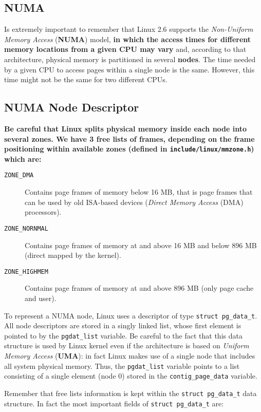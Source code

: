 \documentclass[10pt,a4paper]{article}
\begin{document}
\subsection{NUMA}

Is extremely important to remember that Linux 2.6 supports the \textit{Non-Uniform Memory Access} (\textbf{NUMA}) model, \textbf{in which the access times for different memory locations from a given CPU may vary} and, according to that architecture, physical memory is partitioned in several \textbf{nodes}. The time needed by a given CPU to access pages within a single node is the same. However, this time might not be the same for two different CPUs. 

\subsection{NUMA Node Descriptor}

\textbf{Be careful that Linux splits physical memory inside each node into several zones. We have 3 free lists of frames, depending on the frame positioning within available zones (defined in \texttt{include/linux/mmzone.h}) which are:}

\begin{description}
\item[\texttt{ZONE\_DMA}] Contains page frames of memory below 16 MB, that is page frames that can be used by old ISA-based devices (\textit{Direct Memory Access} (DMA) processors).
\item[\texttt{ZONE\_NORNMAL}] Contains page frames of memory at and above 16 MB and below 896 MB (direct mapped by the kernel).
\item[\texttt{ZONE\_HIGHMEM}] Contains page frames of memory at and above 896 MB (only page cache and user).
\end{description}

To represent a NUMA node, Linux uses a descriptor of type \texttt{struct pg\_data\_t}. All node descriptors are stored in a singly linked list, whose first
element is pointed to by the \texttt{pgdat\_list} variable. Be careful to the fact that this data structure is used by Linux kernel even if the architecture is based on \textit{Uniform Memory Access} (\textbf{UMA}): in fact Linux makes use of a single node that includes all system physical memory. Thus, the \texttt{pgdat\_list} variable points to a list consisting of a single element (node 0) stored in the \texttt{contig\_page\_data} variable.

Remember that free lists information is kept within the \texttt{struct pg\_data\_t} data structure. In fact the most important fields of \texttt{struct pg\_data\_t} are:
\end{document}
